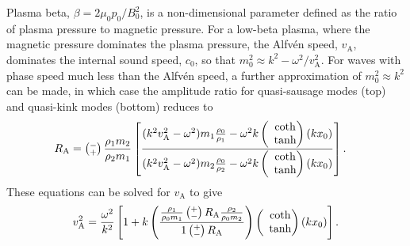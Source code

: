 \documentclass[namedreferences]{solarphysics}
\numberwithin{equation}{section}
\begin{document}
\begin{article}
Plasma beta, $\beta = 2\mu_0p_0/B_0^2$, is a non-dimensional parameter defined as the ratio of plasma pressure to magnetic pressure. For a low-beta plasma, where the magnetic pressure dominates the plasma pressure, the Alfv\'{e}n speed, $v_\textrm{A}$, dominates the internal sound speed, $c_0$, so that $m_0^2 \approx k^2-\omega^2/v_\textrm{A}^2$. For waves with phase speed much less than the Alfv\'{e}n speed, a further approximation of $m_0^2 \approx k^2$ can be made, in which case the amplitude ratio for quasi-sausage modes (top) and quasi-kink modes (bottom) reduces to
\begin{align}
R_\textrm{A} &= \left(\substack{- \\ +}\right) \frac{\rho_1m_2}{\rho_2m_1} \left[ \frac{(k^2v_\textrm{A}^2-\omega^2)m_1\frac{\rho_0}{\rho_1}-\omega^2k \left(\hspace{-0.07in}\begin{matrix} &\coth \\ &\tanh \end{matrix}\right)(kx_0)}{(k^2v_\textrm{A}^2-\omega^2)m_2\frac{\rho_0}{\rho_2}-\omega^2k \left(\hspace{-0.07in}\begin{matrix} &\coth \\ &\tanh \end{matrix}\right)(kx_0)} \right].
\end{align}
These equations can be solved for $v_\textrm{A}$ to give
\begin{equation}
v_\textrm{A}^2 = \frac{\omega^2}{k^2} \left[1 + k \left( \frac{ \frac{\rho_1}{\rho_0m_1} \left(\substack{+ \\ -}\right) R_\textrm{A}\frac{\rho_2}{\rho_0m_2}}{1 \left(\substack{+ \\ -}\right) R_\textrm{A}} \right) \left(\hspace{-0.07in}\begin{matrix} &\coth \\ &\tanh \end{matrix}\right) (kx_0)\right].
\end{equation}




\end{article}
\end{document}
